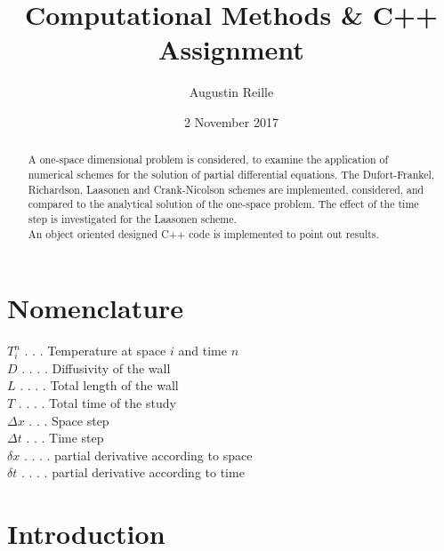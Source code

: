 \documentclass{article}
\title{Computational Methods \& C++ Assignment}
\author{Augustin Reille}
\date{2 November 2017}
\begin{document}
    \maketitle

    \begin{abstract}
        A one-space dimensional problem is considered, to examine the application
        of numerical schemes for the solution of partial differential equations.
        The Dufort-Frankel, Richardson, Laasonen and Crank-Nicolson schemes are implemented,
        considered, and compared to the analytical solution of the one-space problem.
        The effect of the time step is investigated for the Laasonen scheme.
        \\ An object oriented designed C++ code is implemented to point out results.
    \end{abstract}

    \newpage
    \tableofcontents

    \newpage
    \listoffigures

    \listoftables
    
    \lstlistoflistings

    \section*{Nomenclature}
        $T_i^n$ . . . Temperature at space $i$ and time $n$\\
        $D$ . . . . Diffusivity of the wall\\
        $L$ . . . . Total length of the wall\\
        $T$ . . . . Total time of the study\\
        $\Delta x$ . . . Space step\\
        $\Delta t$ . . . Time step\\
        $\delta x$ . . . . partial derivative according to space\\
        $\delta t$ . . . . partial derivative according to time\\
    \newpage
    \section{Introduction}
\end{document}
